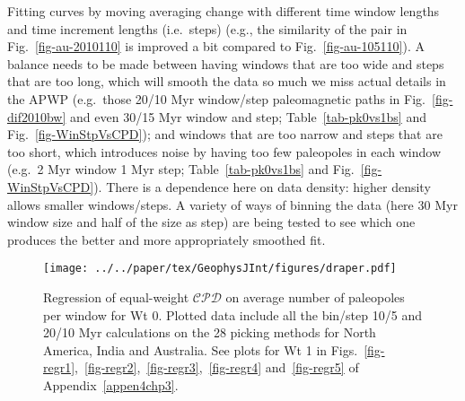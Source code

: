 Fitting curves by moving averaging change with different time window lengths and
time increment lengths (i.e.\ steps) (e.g., the similarity of the pair in
Fig.~\ref{fig-au-2010110} is improved a bit compared to
Fig.~\ref{fig-au-105110}). A balance needs to be made between having windows
that are too wide and steps that are too long, which will smooth the data so
much we miss actual details in the APWP (e.g.\ those 20/10 Myr window/step
paleomagnetic paths in Fig.~\ref{fig-dif2010bw} and even 30/15 Myr window and
step; Table~\ref{tab-pk0vs1bs} and Fig.~\ref{fig-WinStpVsCPD}); and windows that
are too narrow and steps that are too short, which introduces noise by having
too few paleopoles in each window (e.g.\ 2 Myr window 1 Myr step;
Table~\ref{tab-pk0vs1bs} and Fig.~\ref{fig-WinStpVsCPD}). There is a dependence
here on data density: higher density allows smaller windows/steps. A variety of
ways of binning the data (here 30 Myr window size and half of the
size as step) are being tested to see which one produces the better and more
appropriately smoothed fit.

\begin{figure}
  \centering
  \texttt{[image: ../../paper/tex/GeophysJInt/figures/draper.pdf]}
  \caption[Regression of $\mathcal{CPD}$ on average number of paleopoles per
    window for Wt 0]{Regression of equal-weight $\mathcal{CPD}$ on average
    number of paleopoles per window for Wt 0. Plotted data include all the
    bin/step 10/5 and 20/10 Myr calculations on the 28 picking methods for North
    America, India and Australia. See plots for Wt 1 in
    Figs.~\ref{fig-regr1},~\ref{fig-regr2},~\ref{fig-regr3},~\ref{fig-regr4}
    and~\ref{fig-regr5} of Appendix~\ref{appen4chp3}.}\label{fig-regr}
\end{figure}

